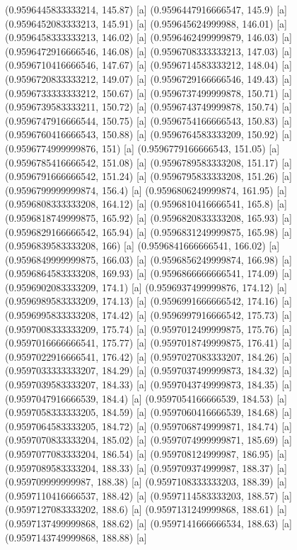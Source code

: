 {{{(0.9596445833333214, 145.87) [a] 
(0.9596447916666547, 145.9) [a] 
(0.9596452083333213, 145.91) [a] 
(0.959645624999988, 146.01) [a] 
(0.9596458333333213, 146.02) [a] 
(0.9596462499999879, 146.03) [a] 
(0.9596472916666546, 146.08) [a] 
(0.9596708333333213, 147.03) [a] 
(0.9596710416666546, 147.67) [a] 
(0.9596714583333212, 148.04) [a] 
(0.9596720833333212, 149.07) [a] 
(0.9596729166666546, 149.43) [a] 
(0.9596733333333212, 150.67) [a] 
(0.9596737499999878, 150.71) [a] 
(0.9596739583333211, 150.72) [a] 
(0.9596743749999878, 150.74) [a] 
(0.9596747916666544, 150.75) [a] 
(0.9596754166666543, 150.83) [a] 
(0.9596760416666543, 150.88) [a] 
(0.9596764583333209, 150.92) [a] 
(0.9596774999999876, 151) [a] 
(0.9596779166666543, 151.05) [a] 
(0.9596785416666542, 151.08) [a] 
(0.9596789583333208, 151.17) [a] 
(0.9596791666666542, 151.24) [a] 
(0.9596795833333208, 151.26) [a] 
(0.9596799999999874, 156.4) [a] 
(0.9596806249999874, 161.95) [a] 
(0.9596808333333208, 164.12) [a] 
(0.9596810416666541, 165.8) [a] 
(0.9596818749999875, 165.92) [a] 
(0.9596820833333208, 165.93) [a] 
(0.9596829166666542, 165.94) [a] 
(0.9596831249999875, 165.98) [a] 
(0.9596839583333208, 166) [a] 
(0.9596841666666541, 166.02) [a] 
(0.9596849999999875, 166.03) [a] 
(0.9596856249999874, 166.98) [a] 
(0.9596864583333208, 169.93) [a] 
(0.9596866666666541, 174.09) [a] 
(0.9596902083333209, 174.1) [a] 
(0.9596937499999876, 174.12) [a] 
(0.9596989583333209, 174.13) [a] 
(0.9596991666666542, 174.16) [a] 
(0.9596995833333208, 174.42) [a] 
(0.9596997916666542, 175.73) [a] 
(0.9597008333333209, 175.74) [a] 
(0.9597012499999875, 175.76) [a] 
(0.9597016666666541, 175.77) [a] 
(0.9597018749999875, 176.41) [a] 
(0.9597022916666541, 176.42) [a] 
(0.9597027083333207, 184.26) [a] 
(0.9597033333333207, 184.29) [a] 
(0.9597037499999873, 184.32) [a] 
(0.9597039583333207, 184.33) [a] 
(0.9597043749999873, 184.35) [a] 
(0.9597047916666539, 184.4) [a] 
(0.9597054166666539, 184.53) [a] 
(0.9597058333333205, 184.59) [a] 
(0.9597060416666539, 184.68) [a] 
(0.9597064583333205, 184.72) [a] 
(0.9597068749999871, 184.74) [a] 
(0.9597070833333204, 185.02) [a] 
(0.9597074999999871, 185.69) [a] 
(0.9597077083333204, 186.54) [a] 
(0.959708124999987, 186.95) [a] 
(0.9597089583333204, 188.33) [a] 
(0.959709374999987, 188.37) [a] 
(0.959709999999987, 188.38) [a] 
(0.9597108333333203, 188.39) [a] 
(0.9597110416666537, 188.42) [a] 
(0.9597114583333203, 188.57) [a] 
(0.9597127083333202, 188.6) [a] 
(0.9597131249999868, 188.61) [a] 
(0.9597137499999868, 188.62) [a] 
(0.9597141666666534, 188.63) [a] 
(0.9597143749999868, 188.88) [a] 
}}}
